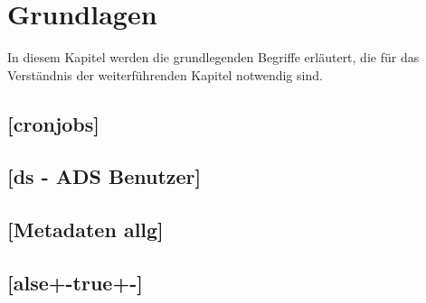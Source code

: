 \section{Grundlagen}
In diesem Kapitel werden die grundlegenden Begriffe erläutert, die für das Verständnis der weiterführenden Kapitel notwendig sind.





\subsection{[cronjobs]}

\subsection{[ds - ADS Benutzer]}
\subsection{[Metadaten allg]}
\subsection{[alse+-true+-]}







